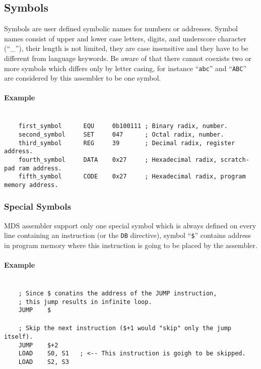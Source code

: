     \subsection{Symbols}
        Symbols are user defined symbolic names for numbers or addresses. Symbol names consist of upper and lower case letters, digits, and underscore character (``\_''), their length is not limited, they are case insensitive and they have to be different from language keywords. Be aware of that there cannot coexists two or more symbols which differs only by letter casing, for instance ``\texttt{abc}'' and ``\texttt{ABC}'' are considered by this assembler to be one symbol.

        \paragraph{Example}
        ~\\
        \verb'    first_symbol      EQU     0b100111 ; Binary radix, number.'\\
        \verb'    second_symbol     SET     047      ; Octal radix, number.'\\
        \verb'    third_symbol      REG     39       ; Decimal radix, register address.'\\
        \verb'    fourth_symbol     DATA    0x27     ; Hexadecimal radix, scratch-pad ram address.'\\
        \verb'    fifth_symbol      CODE    0x27     ; Hexadecimal radix, program memory address.'

        \subsubsection{Special Symbols}
            MDS assembler support only one special symbol which is always defined on every line containing an instruction (or the \texttt{DB} directive), symbol ``\texttt{\$}'' contains address in program memory where this instruction is going to be placed by the assembler.

            \paragraph{Example}
                ~\\
                \verb'    ; Since $ conatins the address of the JUMP instruction,'\\
                \verb'    ; this jump results in infinite loop.'\\
                \verb'    JUMP    $'\\
                \verb''\\
                \verb'    ; Skip the next instruction ($+1 would "skip" only the jump itself).'\\
                \verb'    JUMP    $+2'\\
                \verb'    LOAD    S0, S1   ; <-- This instruction is goigh to be skipped.'\\
                \verb'    LOAD    S2, S3'

